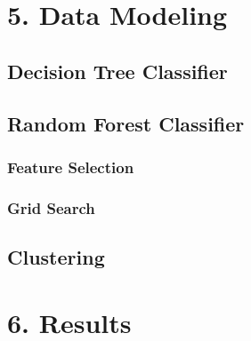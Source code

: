 \documentclass[10pt]{article}
\begin{document}
\section*{5. Data Modeling}

\subsection*{Decision Tree Classifier}


\subsection*{Random Forest Classifier}

\subsubsection*{Feature Selection}

\subsubsection*{Grid Search}

\subsection*{Clustering}

\section*{6. Results}
\end{document}

